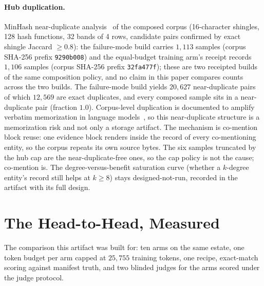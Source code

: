 \documentclass{article}
\begin{document}
\paragraph{Hub duplication.}
MinHash near-duplicate analysis~\cite{broder1997resemblance} of the composed corpus (16-character shingles, 128 hash functions, 32 bands of 4 rows, candidate pairs confirmed by exact shingle Jaccard $\geq 0.8$): the failure-mode build carries $1{,}113$ samples (corpus SHA-256 prefix \texttt{9290b008}) and the equal-budget training arm's receipt records $1{,}106$ samples (corpus SHA-256 prefix \texttt{32fa477f}); these are two receipted builds of the same composition policy, and no claim in this paper compares counts across the two builds. The failure-mode build yields $20{,}627$ near-duplicate pairs of which $12{,}569$ are exact duplicates, and every composed sample sits in a near-duplicate pair (fraction $1.0$). Corpus-level duplication is documented to amplify verbatim memorization in language models~\cite{lee2022dedup}, so this near-duplicate structure is a memorization risk and not only a storage artifact. The mechanism is co-mention block reuse: one evidence block renders inside the record of every co-mentioning entity, so the corpus repeats its own source bytes. The six samples truncated by the hub cap are the near-duplicate-free ones, so the cap policy is not the cause; co-mention is. The degree-versus-benefit saturation curve (whether a $k$-degree entity's record still helps at $k \geq 8$) stays designed-not-run, recorded in the artifact with its full design.

\section{The Head-to-Head, Measured}
\label{sec:headtohead}

The comparison this artifact was built for: ten arms on the same estate, one token budget per arm capped at $25{,}755$ training tokens, one recipe, exact-match scoring against manifest truth, and two blinded judges for the arms scored under the judge protocol.
\end{document}

